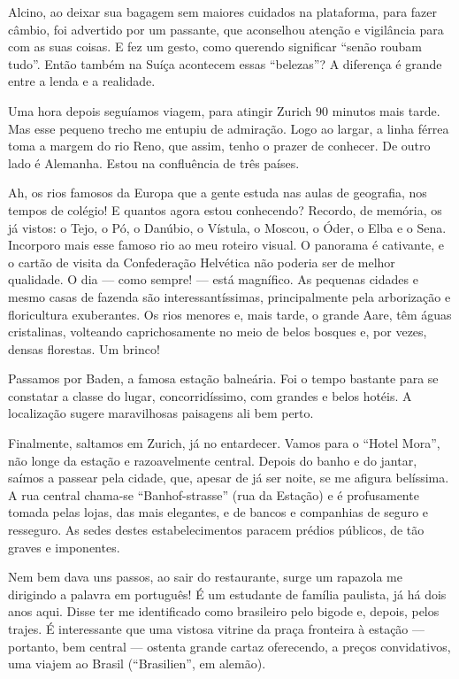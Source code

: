 Alcino, ao deixar sua bagagem sem maiores cuidados na plataforma, para fazer câmbio, foi advertido por um passante, que aconselhou atenção e vigilância para com as suas coisas. E fez um gesto, como querendo significar ``senão roubam tudo''. Então também na Suíça acontecem essas ``belezas''? A diferença é grande entre a lenda e a realidade.

Uma hora depois seguíamos viagem, para atingir Zurich 90 minutos mais tarde. Mas esse pequeno trecho me entupiu de admiração. Logo ao largar, a linha férrea toma a margem do rio Reno, que assim, tenho o prazer de conhecer. De outro lado é Alemanha. Estou na confluência de três países.

Ah, os rios famosos da Europa que a gente estuda nas aulas de geografia, nos tempos de colégio! E quantos agora estou conhecendo? Recordo, de memória, os já vistos: o Tejo, o Pó, o Danúbio, o Vístula, o Moscou, o Óder, o Elba e o Sena. Incorporo mais esse famoso rio ao meu roteiro visual. O panorama é cativante, e o cartão de visita da Confederação Helvética não poderia ser de melhor qualidade. O dia --- como sempre! --- está magnífico. As pequenas cidades e mesmo casas de fazenda são interessantíssimas, principalmente pela arborização e floricultura exuberantes. Os rios menores e, mais tarde, o grande Aare, têm águas cristalinas, volteando caprichosamente no meio de belos bosques e, por vezes, densas florestas. Um brinco!

Passamos por Baden, a famosa estação balneária. Foi o tempo bastante para se constatar a classe do lugar, concorridíssimo, com grandes e belos hotéis. A localização sugere maravilhosas paisagens ali bem perto.

Finalmente, saltamos em Zurich, já no entardecer. Vamos para o ``Hotel Mora'', não longe da estação e razoavelmente central. Depois do banho e do jantar, saímos a passear pela cidade, que, apesar de já ser noite, se me afigura belíssima. A rua central chama-se ``Banhof-strasse'' (rua da Estação) e é profusamente tomada pelas lojas, das mais elegantes, e de bancos e companhias de seguro e resseguro. As sedes destes estabelecimentos paracem prédios públicos, de tão graves e imponentes.

Nem bem dava uns passos, ao sair do restaurante, surge um rapazola me dirigindo a palavra em português! É um estudante de família paulista, já há dois anos aqui. Disse ter me identificado como brasileiro pelo bigode e, depois, pelos trajes. É interessante que uma vistosa vitrine da praça fronteira à estação --- portanto, bem central --- ostenta grande cartaz oferecendo, a preços convidativos, uma viajem ao Brasil (``Brasilien'', em alemão).

